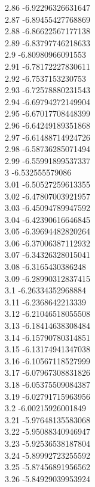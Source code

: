 {2.86	-6.92296326631647\\
2.87	-6.89455427768869\\
2.88	-6.86622567177138\\
2.89	-6.83797746218633\\
2.9	-6.80980966091553\\
2.91	-6.78172227830611\\
2.92	-6.7537153230753\\
2.93	-6.72578880231543\\
2.94	-6.69794272149904\\
2.95	-6.67017708448399\\
2.96	-6.64249189351868\\
2.97	-6.61488714924726\\
2.98	-6.58736285071494\\
2.99	-6.55991899537337\\
3	-6.532555579086\\
3.01	-6.50527259613355\\
3.02	-6.47807003921957\\
3.03	-6.45094789947592\\
3.04	-6.42390616646845\\
3.05	-6.39694482820264\\
3.06	-6.37006387112932\\
3.07	-6.34326328015041\\
3.08	-6.3165430386248\\
3.09	-6.28990312837415\\
3.1	-6.26334352968884\\
3.11	-6.2368642213339\\
3.12	-6.21046518055508\\
3.13	-6.18414638308484\\
3.14	-6.15790780314851\\
3.15	-6.13174941347038\\
3.16	-6.10567118527999\\
3.17	-6.07967308831826\\
3.18	-6.05375509084387\\
3.19	-6.02791715963956\\
3.2	-6.00215926001849\\
3.21	-5.97648135583068\\
3.22	-5.95088340946947\\
3.23	-5.92536538187804\\
3.24	-5.89992723255592\\
3.25	-5.87456891956562\\
3.26	-5.84929039953924\\
}
